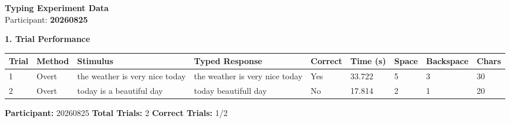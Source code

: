 \documentclass[10pt,a4paper]{article}
\begin{document}

\begin{center}
    {\Large\bfseries Typing Experiment Data}\\
    \vspace{2pt}
    Participant: \textbf{20260825}
\end{center}

\vspace{0.25cm}


\noindent
{\large\bfseries 1. Trial Performance}

\vspace{0.08cm}

\begin{center}
\begin{tabularx}{\textwidth}{
    C{0.45in}
    C{0.65in}
    L{2.35in}
    L{2.55in}
    C{0.65in}
    C{0.65in}
    C{0.55in}
    C{0.75in}
    C{0.55in}
}
\toprule

\textbf{Trial} &
\textbf{Method} &
\textbf{Stimulus} &
\textbf{Typed Response} &
\textbf{Correct} &
\textbf{Time (s)} &
\textbf{Space} &
\textbf{Backspace} &
\textbf{Chars}
\\

\midrule

1 &
Overt &
the weather is very nice today &
the weather is very nice today &
Yes &
33.722 &
5 &
3 &
30
\\

2 &
Overt &
today is a beautiful day &
today beautifull day &
No &
17.814 &
2 &
1 &
20
\\

\bottomrule
\end{tabularx}
\end{center}

\vfill


\noindent
\textbf{Participant:} 20260825
\hfill
\textbf{Total Trials:} 2
\hfill
\textbf{Correct Trials:} 1/2
\end{document}
